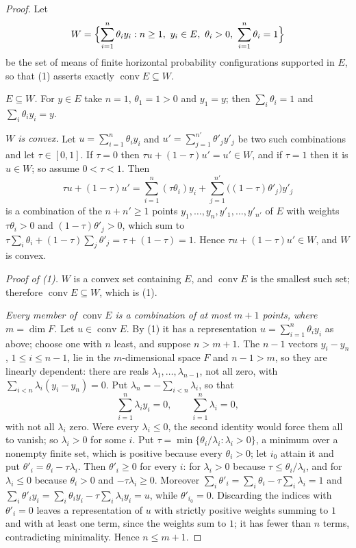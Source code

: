 \begin{proof}
Let
\[
  W=\Bigl\{\sum_{i=1}^n\theta_iy_i:n\ge1,\ y_i\in E,\ \theta_i>0,\
     \sum_{i=1}^n\theta_i=1\Bigr\}
\]
be the set of means of finite horizontal probability configurations supported in
$E$, so that (1) asserts exactly $\operatorname{conv}E\subseteq W$.

\emph{$E\subseteq W$.} For $y\in E$ take $n=1$, $\theta_1=1>0$ and $y_1=y$; then
$\sum_i\theta_i=1$ and $\sum_i\theta_iy_i=y$.

\emph{$W$ is convex.} Let $u=\sum_{i=1}^n\theta_iy_i$ and
$u'=\sum_{j=1}^{n'}\theta'_jy'_j$ be two such combinations and let
$\tau\in[0,1]$. If $\tau=0$ then $\tau u+(1-\tau)u'=u'\in W$, and if $\tau=1$
then it is $u\in W$; so assume $0<\tau<1$. Then
\[
  \tau u+(1-\tau)u'=\sum_{i=1}^n(\tau\theta_i)y_i
     +\sum_{j=1}^{n'}\bigl((1-\tau)\theta'_j\bigr)y'_j
\]
is a combination of the $n+n'\ge1$ points $y_1,\dots,y_n,y'_1,\dots,y'_{n'}$ of
$E$ with weights $\tau\theta_i>0$ and $(1-\tau)\theta'_j>0$, which sum to
$\tau\sum_i\theta_i+(1-\tau)\sum_j\theta'_j=\tau+(1-\tau)=1$. Hence
$\tau u+(1-\tau)u'\in W$, and $W$ is convex.

\emph{Proof of (1).} $W$ is a convex set containing $E$, and
$\operatorname{conv}E$ is the smallest such set; therefore
$\operatorname{conv}E\subseteq W$, which is (1).

\emph{Every member of $\operatorname{conv}E$ is a combination of at most $m+1$
points, where $m=\dim F$.} Let $u\in\operatorname{conv}E$. By (1) it has a
representation $u=\sum_{i=1}^n\theta_iy_i$ as above; choose one with $n$ least,
and suppose $n>m+1$. The $n-1$ vectors $y_i-y_n$, $1\le i\le n-1$, lie in the
$m$-dimensional space $F$ and $n-1>m$, so they are linearly dependent: there are
reals $\lambda_1,\dots,\lambda_{n-1}$, not all zero, with
$\sum_{i<n}\lambda_i(y_i-y_n)=0$. Put $\lambda_n=-\sum_{i<n}\lambda_i$, so that
\[
  \sum_{i=1}^n\lambda_iy_i=0,\qquad\sum_{i=1}^n\lambda_i=0,
\]
with not all $\lambda_i$ zero. Were every $\lambda_i\le0$, the second identity
would force them all to vanish; so $\lambda_i>0$ for some $i$. Put
$\tau=\min\{\theta_i/\lambda_i:\lambda_i>0\}$, a minimum over a nonempty finite
set, which is positive because every $\theta_i>0$; let $i_0$ attain it and put
$\theta'_i=\theta_i-\tau\lambda_i$. Then $\theta'_i\ge0$ for every $i$: for
$\lambda_i>0$ because $\tau\le\theta_i/\lambda_i$, and for $\lambda_i\le0$
because $\theta_i>0$ and $-\tau\lambda_i\ge0$. Moreover
$\sum_i\theta'_i=\sum_i\theta_i-\tau\sum_i\lambda_i=1$ and
$\sum_i\theta'_iy_i=\sum_i\theta_iy_i-\tau\sum_i\lambda_iy_i=u$, while
$\theta'_{i_0}=0$. Discarding the indices with $\theta'_i=0$ leaves a
representation of $u$ with strictly positive weights summing to $1$ and with at
least one term, since the weights sum to $1$; it has fewer than $n$ terms,
contradicting minimality. Hence $n\le m+1$.


\end{proof}
